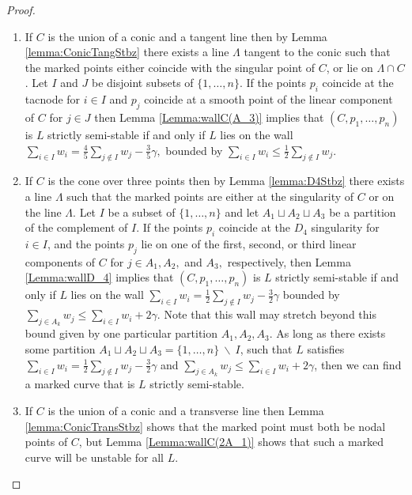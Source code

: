 \documentclass{amsart}
\numberwithin{equation}{section}
\theoremstyle{definition}
\begin{document}
\begin{proof}
\begin{enumerate}[label=(\roman*)]
    \item If $C$ is the union of a conic and a tangent line then by Lemma \ref{lemma:ConicTangStbz} there exists a line $\Lambda$ tangent to the conic such that the marked points either coincide with the singular point of $C$, or lie on $\Lambda \cap C$. Let $I$ and $J$ be disjoint subsets of $\{1, \dots , n\}$. If the points $p_i$ coincide at the tacnode for $i \in I$ and $p_j$ coincide at a smooth point of the linear component of $C$ for $j \in J$ then Lemma \ref{Lemma:wallC(A_3)} implies that $(C, p_1, \dots , p_n)$ is $L$ strictly semi-stable if and only if $L$ lies on the wall $ \sum_{i \in I} w_i  = \frac{4}{5} \sum_{j \notin I} w_j  - \frac{3}{5}\gamma ,$ bounded by $ \sum_{i \in I} w_i \leq \frac{1}{2} \sum_{j \notin I} w_j$.

    \item If $C$ is the cone over three points then by Lemma \ref{lemma:D4Stbz} there exists a line $\Lambda$ such that the marked points are either at the singularity of $C$ or on the line $\Lambda$. Let $I$ be a subset of $\{1, \dots , n\}$ and let $A_1 \sqcup A_2 \sqcup A_3$ be a partition of the complement of $I$. If the points $p_i$ coincide at the $D_4$ singularity for $i \in I$, and the points $p_j$ lie on one of the first, second, or third linear components of $C$ for $j \in A_1, A_2,$ and $A_3,$ respectively, then Lemma \ref{Lemma:wallD_4} implies that  $(C, p_1, \dots, p_n)$ is $L$ strictly semi-stable if and only if $L$ lies on the wall $\sum_{i \in I} w_i = \frac{1}{2} \sum_{j \notin I} w_j - \frac{3}{2} \gamma$ bounded by $\sum_{j \in A_k} w_j  \leq \sum_{i \in I} w_i + 2 \gamma$. Note that this wall may stretch beyond this bound given by one particular partition $A_1, A_2, A_3$. As long as there exists some partition $A_1 \sqcup A_2 \sqcup A_3 = \{1, \dots , n\} \ \backslash \ I$,  such that $L$  satisfies $\sum_{i \in I} w_i = \frac{1}{2} \sum_{j \notin I} w_j - \frac{3}{2} \gamma$ and $\sum_{j \in A_k} w_j  \leq \sum_{i \in I} w_i + 2 \gamma$, then we can find a marked curve that is $L$ strictly semi-stable. 

    \item If $C$ is the union of a conic and a transverse line then Lemma \ref{lemma:ConicTransStbz} shows that the marked point must both be nodal points of $C$, but Lemma \ref{Lemma:wallC(2A_1)} shows that such a marked curve will be unstable for all $L$.
\end{enumerate}
    
\end{proof}
\end{document}
